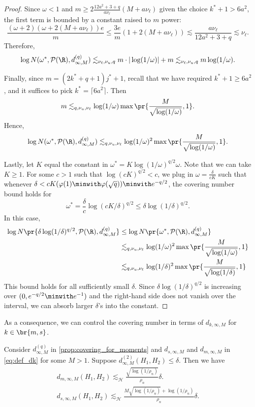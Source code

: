 \documentclass[12pt, reqno]{amsart}
\newcommand{\leH}{\lesssim_{\mathcal{H}}}
\numberwithin{equation}{section}
\begin{document}
\begin{refsection}
\begin{appendices}
\begin{proof}
Since $\omega < 1$ and $m \ge 2\frac{12a^2 + 3 + q}{a \nu_\ell} (M + a \nu_\ell)$ given
the choice $k^* +1 > 6a^2$, the first
term is bounded by a constant raised to $m$\th{} power: \[
\frac{(\omega + 2) (\omega + 2(M + a \nu_\ell)) e}{m} \le \frac{3e}{m} (1 + 2(M + a
\nu_\ell)) \lesssim \frac{a \nu_\ell}{12 a^2 + 3 + q} \lesssim \nu_\ell.\]
Therefore, \[\log N(\omega^*, \mathcal P(\R), d^{(q)}_{\infty, M}) \lesssim_
{\nu_\ell, \nu_u, q} m \cdot
|\log
(1/\omega)| + m \lesssim_{\nu_\ell, \nu_u, q} m \log (1/\omega).\]

Finally, since $m = (2k^* + q + 1) j^* + 1$, recall that we have required $k^* + 1\ge
6a^2$, and it suffices to pick $k^* = \lceil 6a^2 \rceil$. Then
 \[m \lesssim_{q, \nu_u, \nu_\ell}
\log(1/\omega) \max\pr{\frac{M}{\sqrt{\log
(1/\omega)}}, 1}.
\]
 Hence, \[
\log  N(\omega^*, \mathcal P(\R), d^{(q)}_{\infty, M}) \lesssim_{q, \nu_u, \nu_\ell} \log(1/\omega)^2 \max
\pr{\frac{M}{\sqrt{\log
(1/\omega)}}, 1}.
\]

Lastly, let $K$ equal the constant in $\omega^* = K \log (1/\omega)^{q/2} \omega$. Note that
we can take $K \ge 1$. For some $c > 1$ such that $\log (c K)^{q/2} < c $, we plug in
$
\omega = \frac{\delta}{cK}
$
such that whenever $\delta < cK(\varphi(1) \minwith \varphi(\sqrt{q})) \minwith e^{-q/2}$,
the
covering number bound holds for \[
\omega^* = \frac{\delta}{c} \log(cK/\delta)^{q/2} \le \delta \log(1/\delta)^{q/2}.
\]
In this case, \begin{align*}
 \log N\pr{
  \delta \log(1/\delta)^{q/2}, \mathcal P(\R), d^{(q)}_{\infty, M}
} &\le \log N\pr{
  \omega^* , \mathcal P(\R), d^{(q)}_{\infty, M}
} \\
&\lesssim_{q, \nu_u, \nu_\ell} \log(1/\omega)^2 \max
\pr{\frac{M}{\sqrt{\log
(1/\omega)}}, 1} \\
&\lesssim_{q, \nu_u, \nu_\ell} \log(1/\delta)^2 \max
\pr{\frac{M}{\sqrt{\log
(1/\delta)}}, 1}
\end{align*}
This bound holds for all sufficiently small $\delta$. Since $\delta \log(1/\delta)^{q/2}$
is increasing over $(0, e^{-q/2} \minwith e^{-1})$ and the right-hand side does not vanish
over the interval, we can absorb larger $\delta$'s into the constant.
\end{proof}

As a consequence, we can control the covering number in terms of $d_{k, \infty, M}$ for
$k \in \br{m,s}$.

\begin{prop}
\label{prop:covering_ms}
Consider $d_{\infty, M}^{(q)}$ in \cref{prop:covering_for_moments} and  $d_
{s,\infty, M}$ and $d_
{m,\infty, M}$ in \eqref{eq:def_dk} for some $M > 1$.
Suppose $d_{\infty, M}^{(2)} (H_1, H_2)\le \delta$. Then we have \begin{align*}
 d_
{m,\infty, M}(H_1, H_2) \leH \frac{\sqrt{\log
(1/\rho_n)}}{\rho_n} \delta.\\
 d_
{s,\infty, M}(H_1, H_2) \leH \frac{M\sqrt{\log
(1/\rho_n)} + \log(1/\rho_n)}{\rho_n} \delta.
\end{align*}


\end{prop}
\end{appendices}
\end{refsection}
\end{document}
